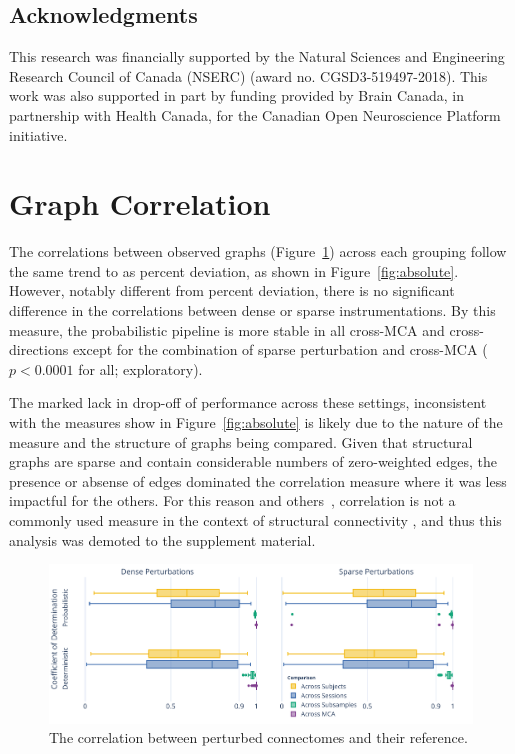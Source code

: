 \documentclass[fleqn,10pt]{SelfArx} %
\newcommand{\new}[1]{{\color{blue} #1}}
\begin{document}
\subsection*{Acknowledgments} 
This research was financially supported by the Natural Sciences and Engineering Research Council of Canada (NSERC)
(award no. CGSD3-519497-2018). This work was also supported in part by funding provided by Brain Canada, in partnership
with Health Canada, for the Canadian Open Neuroscience Platform initiative.




\beginsupplement

\clearpage
\section{Graph Correlation}
\label{supsec:correlation}
The correlations between observed graphs (Figure~\ref{fig:correlation}) across each grouping follow the same trend to
as percent deviation, as shown in Figure~\ref{fig:absolute}. However, notably different from percent deviation, there
is no significant difference in the correlations between \new{dense} or \new{sparse} instrumentations. By this measure, the
probabilistic pipeline is more stable in all cross-MCA and cross-directions except for the combination of \new{sparse}
perturbation and cross-MCA ($p < 0.0001$ for all; exploratory).

The marked lack in drop-off of performance across these settings, inconsistent with the measures show in
Figure~\ref{fig:absolute} is \new{likely due} to the nature of the measure and the \new{structure of graphs being compared}.
Given that structural graphs are sparse and contain considerable numbers of zero-weighted edges, the presence or
absense of edges dominated the correlation measure where it was less impactful for the others. For this reason and
others~\cite{huang2016linking}, correlation is not a commonly used measure in the context of structural connectivity\new{,
and thus this analysis was demoted to the supplement material}.

\begin{figure}[ht]\centering
\includegraphics[width=\linewidth]{figures/figS1_correlation_differences.pdf}
\caption{The correlation between perturbed connectomes and their reference.}
\label{fig:correlation}
\end{figure}
\end{document}
